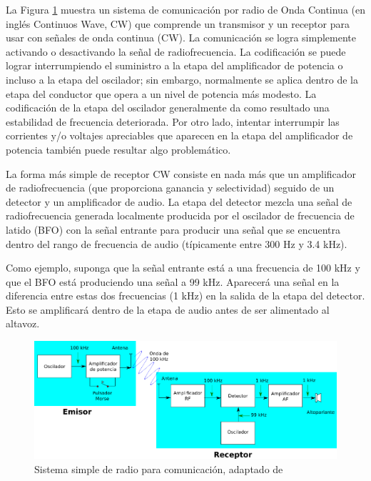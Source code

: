 La Figura \ref{fig:09.sistema.simple.radio}  muestra un sistema de comunicación por radio de Onda Continua (en inglés Continuos Wave, CW) que comprende un transmisor y un receptor para usar con señales de onda continua (CW). La comunicación se logra simplemente activando o desactivando la señal de radiofrecuencia. La codificación se puede lograr interrumpiendo el suministro a la etapa del amplificador de potencia o incluso a la etapa del oscilador; sin embargo, normalmente se aplica dentro de la etapa del conductor que opera a un nivel de potencia más modesto. La codificación de la etapa del oscilador generalmente da como resultado una estabilidad de frecuencia deteriorada. Por otro lado, intentar interrumpir las corrientes y/o voltajes apreciables que aparecen en la etapa del amplificador de potencia también puede resultar algo problemático.

La forma más simple de receptor CW consiste en nada más que un amplificador de radiofrecuencia (que proporciona ganancia y selectividad) seguido de un detector y un amplificador de audio. La etapa del detector mezcla una señal de radiofrecuencia generada localmente producida por el oscilador de frecuencia de latido (BFO) con la señal entrante para producir una señal que se encuentra dentro del rango de frecuencia de audio (típicamente entre 300 Hz y 3.4 kHz).

Como ejemplo, suponga que la señal entrante está a una frecuencia de 100 kHz y que el BFO 
está produciendo una señal a 99 kHz. Aparecerá una señal en la diferencia entre estas dos frecuencias (1 kHz) en la salida de la etapa del detector. Esto se amplificará dentro de la etapa de audio antes de ser alimentado al altavoz.


\begin{figure}[!htb]
  \centering
  \includegraphics[width=\textwidth]{09.sintesis.comunicaciones.a.bordo/Imagenes.U09/U09_receptor_simple_radio.png}
  \caption{Sistema simple de radio para comunicaci\'on, adaptado de \protect\cite{Tooley_Aircraft_communications_and_navigation_systems}}
  \label{fig:09.sistema.simple.radio}
\end{figure}


